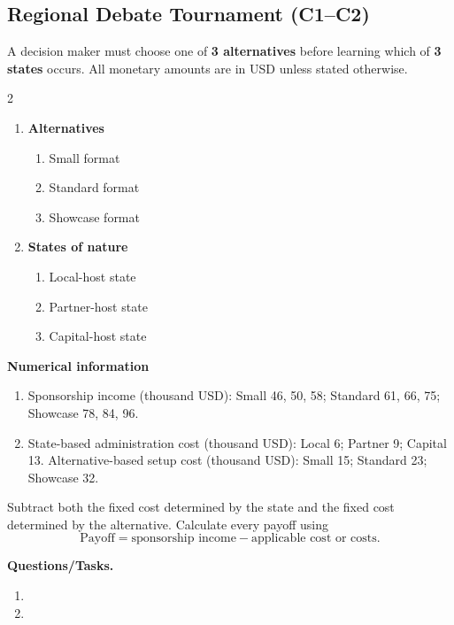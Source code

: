 \subsection{Regional Debate Tournament (C1--C2)}
\label{sec:problem12-regional-debate-tournament-c1-c2}
A decision maker must choose one of \textbf{3 alternatives} before learning which of \textbf{3 states} occurs. All monetary amounts are in USD unless stated otherwise.
\begin{multicols}{2}
\begin{enumerate}[label=\arabic*.]
 \item \textbf{Alternatives}
 \begin{enumerate}[label=\roman*)]
  \item Small format
  \item Standard format
  \item Showcase format
 \end{enumerate}
 \item \textbf{States of nature}
 \begin{enumerate}[label=\roman*)]
  \item Local-host state
  \item Partner-host state
  \item Capital-host state
 \end{enumerate}
\end{enumerate}
\end{multicols}
 \textbf{Numerical information}
 \begin{enumerate}[label=\roman*)]
  \item Sponsorship income (thousand USD): Small 46, 50, 58; Standard 61, 66, 75; Showcase 78, 84, 96.
  \item State-based administration cost (thousand USD): Local 6; Partner 9; Capital 13. Alternative-based setup cost (thousand USD): Small 15; Standard 23; Showcase 32.
 \end{enumerate}
Subtract both the fixed cost determined by the state and the fixed cost determined by the alternative. Calculate every payoff using
\[
 \text{Payoff}=\text{sponsorship income}-\text{applicable cost or costs}.
\]

\textbf{Questions/Tasks.}
\begin{enumerate}[label=\textbf{\alph*)}]
 \item {}
 \item {}
\end{enumerate}
